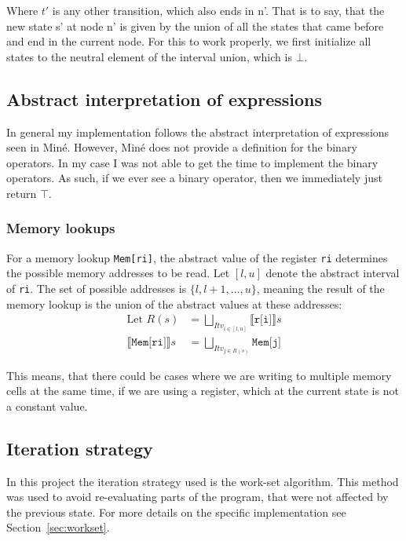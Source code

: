 Where $t'$ is any other transition, which also ends in n'. That is to say, that
the new state s' at node n' is given by the union of all the states that came
before and end in the current node. For this to work properly, we first
initialize all states to the neutral element of the interval union, which is
$\bot$.


\subsection{Abstract interpretation of expressions}
In general my implementation follows the abstract interpretation of expressions
seen in Miné\cite{mine}. However, Miné does not provide a definition for the
binary operators. In my case I was not able to get the time to implement the
binary operators. As such, if we ever see a binary operator, then we
immediately just return $\top$.

\subsubsection{Memory lookups}\label{sec:introductionMem}
For a memory lookup \texttt{Mem[ri]}, the abstract value of the register
\texttt{ri} determines the possible memory addresses to be read. Let $[l, u]$
denote the abstract interval of \texttt{ri}. The set of possible addresses is
$\{l, l+1, \dots, u\}$, meaning the result of the memory lookup is the union of
the abstract values at these addresses:
\begin{align}
  \text{Let } R(s)&= \bigsqcup_{Itv_{i \in [l, u]}} \llbracket \texttt{r[i]} \rrbracket s \\
  \llbracket \texttt{Mem[ri]} \rrbracket s &= \bigsqcup_{Itv_{j \in R(s)}} \texttt{Mem[j]}
\end{align}

This means, that there could be cases where we are writing to multiple memory
cells at the same time, if we are using a register, which at the current state
is not a constant value.


\subsection{Iteration strategy}
In this project the iteration strategy used is the work-set algorithm. This
method was used to avoid re-evaluating parts of the program, that were not
affected by the previous state. For more details on the specific implementation
see Section~\ref{sec:workset}.

